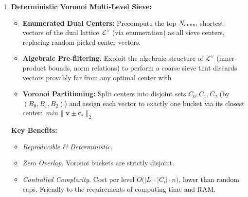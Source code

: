 \documentclass[25pt,a0paper,portrait]{tikzposter}
\begin{document}
\begin{columns}
{  \begin{enumerate}
    \item \textbf{Deterministic Voronoi Multi-Level Sieve:}
      \begin{itemize}
        \item \textbf{Enumerated Dual Centers:}
          Precompute the top $N_{\rm enum}$ shortest vectors of the dual
          lattice $\mathcal{L}^\vee$ (via enumeration) as all sieve centers, replacing random picked center vectors.
        \item \textbf{Algebraic Pre‐filtering.}
          Exploit the algebraic structure of $\mathcal{L}^\vee$ (inner‐product bounds, norm relations)
          to perform a coarse sieve that discards vectors provably far from any optimal center with 
        \item \textbf{Voronoi Partitioning:}
          Split centers into disjoint sets $C_0,C_1,C_2$ (by $(B_0,B_1,B_2)$)
          and assign each vector to exactly one bucket via its closest center:\ $min \|\mathbf{v}\pm \mathbf{c}_i\|_2$
      \end{itemize}
      \textbf{Key Benefits:}
      \begin{itemize}
        \item \emph{Reproducible \& Deterministic.}
        \item \emph{Zero Overlap.}  Voronoi buckets are strictly disjoint. 
        \item \emph{Controlled Complexity.}
          Cost per level $O\bigl(|L|\cdot|C_i|\cdot n\bigr)$, lower than random caps. Friendly to the requirements of computing time and RAM.
      \end{itemize}


\end{enumerate}}
\end{columns}
\end{document}
